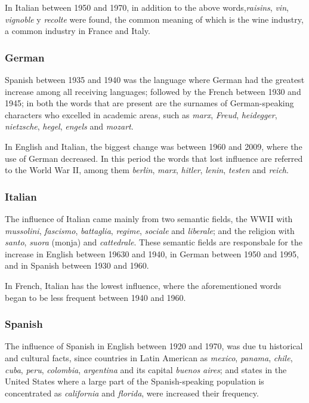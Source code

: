 \documentclass[10pt,letterpaper]{article} %
\begin{document}
In Italian between 1950 and 1970, in addition to the above words,\textit{raisins}, \textit{vin}, \textit{vignoble} y \textit{recolte} were found, the common meaning of which is the wine industry, a common industry in France and Italy.

\subsubsection*{German} %

Spanish between 1935 and 1940 was the language where German had the greatest increase among all receiving languages; followed by the French between 1930 and 1945; in both  the words that are present are the surnames of German-speaking characters who excelled in academic areas, such as \textit{marx}, \textit{Freud}, \textit{heidegger}, \textit{nietzsche}, \textit{hegel}, \textit{engels} and \textit{mozart}.

In English and Italian, the biggest change was between 1960 and 2009, where the use of German decreased. In this period the words that lost influence are referred to the World War II, among them \textit{berlin}, \textit{marx}, \textit{hitler}, \textit{lenin}, \textit{testen}  and \textit{reich}.
\subsubsection*{Italian} %
 
 
The influence of Italian came mainly from two semantic fields, the WWII 
with \textit{mussolini}, \textit{fascismo}, \textit{battaglia}, \textit{regime}, \textit{sociale} and \textit{liberale}; and the religion with \textit{santo}, \textit{suora} (monja) and \textit{cattedrale}. These semantic fields are responsbale for the increase in English between 19630 and 1940, in German between 1950 and 1995, and in Spanish between 1930 and 1960.
 
In French, Italian has the lowest influence, where the aforementioned words began to be less frequent between 1940 and 1960.
\subsubsection*{Spanish} %

The influence of Spanish in English between 1920 and 1970, was due tu historical and cultural facts, since countries in Latin American as  \textit{mexico}, \textit{panama}, \textit{chile}, \textit{cuba}, \textit{peru}, \textit{colombia}, \textit{argentina} and its capital \textit{buenos} \textit{aires};  and states in the United States  where a large part of the Spanish-speaking population is concentrated as \textit{california} and \textit{florida}, were increased their frequency.
\end{document}

